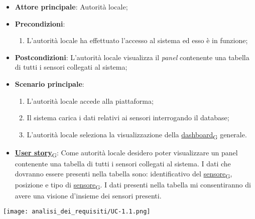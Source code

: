 \begin{itemize}
	\item \textbf{Attore principale}: Autorità locale;
	\item \textbf{Precondizioni}:
	      \begin{enumerate}
		      \item L'autorità locale ha effettuato l'accesso al sistema ed esso è in funzione;
	      \end{enumerate}
	\item \textbf{Postcondizioni}:
	      L'autorità locale visualizza il \textit{panel} contenente una tabella di tutti i sensori collegati al sistema;

	\item \textbf{Scenario principale}:
	      \begin{enumerate}
		      \item L'autorità locale accede alla piattaforma;
		      \item Il sistema carica i dati relativi ai sensori interrogando il database;
		      \item L'autorità locale seleziona la visualizzazione della \href{https://7last.github.io/docs/rtb/documentazione-interna/glossario\#dashboard}{dashboard\textsubscript{G}} generale.
	      \end{enumerate}
	\item \href{https://7last.github.io/docs/rtb/documentazione-interna/glossario\#user-story}{\textbf{User story}\textsubscript{G}}: Come autorità locale desidero poter visualizzare un panel contenente una tabella di tutti i sensori collegati al sistema.
	      I dati che dovranno essere presenti nella tabella sono: identificativo del \href{https://7last.github.io/docs/rtb/documentazione-interna/glossario\#sensore}{sensore\textsubscript{G}}, posizione e tipo di \href{https://7last.github.io/docs/rtb/documentazione-interna/glossario\#sensore}{sensore\textsubscript{G}}.
	      I dati presenti nella tabella mi consentiranno di avere una visione d'insieme dei sensori presenti.

\end{itemize}
\begin{center}
	\texttt{[image: analisi\_dei\_requisiti/UC-1.1.png]}
\end{center}

